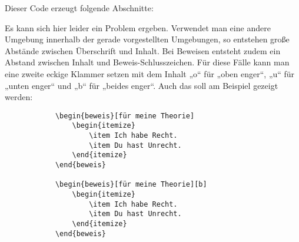 			Dieser Code erzeugt folgende Abschnitte:

			\newline

			Es kann sich hier leider ein Problem ergeben. Verwendet man eine andere Umgebung innerhalb der gerade vorgestellten Umgebungen, so entstehen große Abstände zwischen Überschrift und Inhalt. Bei Beweisen entsteht zudem ein Abstand zwischen Inhalt und Beweis-Schlusszeichen. Für diese Fälle kann man eine zweite eckige Klammer setzen mit dem Inhalt „o“ für „oben enger“, „u“ für „unten enger“ und „b“ für „beides enger“. Auch das soll am Beispiel gezeigt werden:

			\begin{verbatim}
			\begin{beweis}[für meine Theorie]
				\begin{itemize}
					\item Ich habe Recht.
					\item Du hast Unrecht.
				\end{itemize}
			\end{beweis}

			\begin{beweis}[für meine Theorie][b]
				\begin{itemize}
					\item Ich habe Recht.
					\item Du hast Unrecht.
				\end{itemize}
			\end{beweis}
			\end{verbatim}\newline

